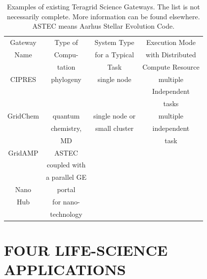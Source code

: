 \documentclass{sig-alternate}
\begin{document}
\begin{table}
 \small
\begin{tabular}{|c|c|c|c|} 
  \hline Gateway  & Type of & System Type & Execution Mode 
  \\
  Name & Compu- & for a Typical & with Distributed \\ 
  &  tation & Task & Compute Resource \\  \hline \hline 
  
  CIPRES   & phylogeny  &  single node  & multiple  \\
   &  &   & Independent   \\ 
  &  &  &  tasks \\  \hline
  GridChem   & quantum & single node or     & multiple  \\
     & chemistry, & small cluster & independent   \\
  & MD &  & task  \\ \hline
   GridAMP     & ASTEC  &   & \\ 
  & coupled with  &     &   \\
  & a parallel GE &   &  \\ \hline
  Nano  & portal  &   & \\
  Hub  & for nano- &   &  \\
   & technology &  &  \\ \hline
  \hline
\end{tabular} \caption{Examples of existing Teragrid Science Gateways. The list is not necessarily complete. More information can be found elsewhere\cite{tg-sg-list-url}.  ASTEC means Aarhus Stellar Evolution Code.}
 \label{table:TG-sg} 
\end{table}





\section{FOUR LIFE-SCIENCE APPLICATIONS}
\end{document}
